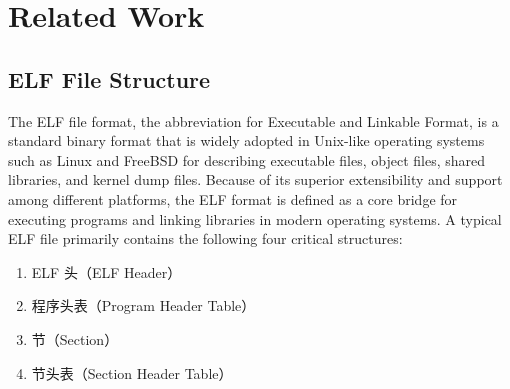 %
%
%
%
%

\chapter{Related Work}
\section{ELF File Structure}

The ELF file format, the abbreviation for Executable and Linkable Format, is a standard binary format that is widely adopted in Unix-like operating systems such as Linux and FreeBSD for describing executable files, object files, shared libraries, and kernel dump files. Because of its superior extensibility and support among different platforms, the ELF format is defined as a core bridge for executing programs and linking libraries in modern operating systems. A typical ELF file primarily contains the following four critical structures:

\begin{enumerate} [label=\arabic*)] 
\item ELF 头（ELF Header）

\item 程序头表（Program Header Table）

\item 节（Section）

\item 节头表（Section Header Table）

\end{enumerate}

